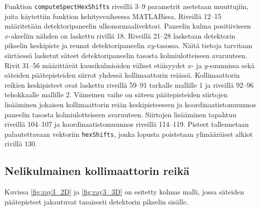 Funktion \texttt{computeSpectHexShifts} riveillä 3--9 parametrit asetetaan muuttujiin, joita käytettiin funktion kehitysvaiheessa MATLABissa. Riveillä 12--15 määritetään detektoripaneelin ulkonormaalivektori. Paneelin kulma positiiviseen $x$-akseliin nähden on laskettu rivillä 18. Riveillä 21--28 lasketaan detektorin pikselin keskipiste ja reunat detektoripaneelin $xy$-tasossa. Näitä tietoja tarvitaan siirtäessä lasketut säteet detektoripaneelin tasosta kolmiulotteiseen avaruuteen. Rivit 31--56 määrittävät kuusikulmioiden väliset etäisyydet $x$- ja $y$-suunnissa sekä säteiden päätepisteiden siirrot yhdessä kollimaattorin reiässä. Kollimaattorin reikien keskipisteet ovat laskettu riveillä 59--91 tarkalle mallille 1 ja riveillä 92--96 tehokkaalle mallille 2. Viimeinen vaihe on säteen päätepisteiden siirtojen lisääminen jokaisen kollimaattorin reiän keskipisteeseen ja koordinaatistomuunnos paneelin tasosta kolmiulotteiseen avaruuteen. Siirtojen lisääminen tapahtuu riveillä 104--107 ja koordinaatistomuunnos riveillä 114--119. Pisteet tallennetaan palautettavaan vektoriin \texttt{hexShifts}, jonka lopusta poistetaan ylimääräiset alkiot rivillä 130.

\subsection{Nelikulmainen kollimaattorin reikä}
Kuvissa \ref{fig:ray3_2D} ja \ref{fig:ray3_3D} on esitetty kolmas malli, jossa säteiden päätepisteet jakautuvat tasaisesti detektorin pikselin sisälle.

